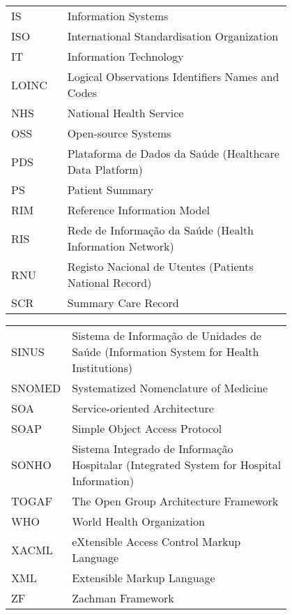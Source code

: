 \begin{flushleft}
\begin{tabular}{l p{0.8\linewidth}}
IS		& Information Systems \\
ISO		& International Standardisation Organization \\
IT		& Information Technology \\
LOINC   & Logical Observations Identifiers Names and Codes \\
NHS		& National Health Service \\
OSS		& Open-source Systems \\
PDS		& Plataforma de Dados da Saúde (Healthcare Data Platform) \\
PS		& Patient Summary \\
RIM		& Reference Information Model \\
RIS		& Rede de Informação da Saúde (Health Information Network) \\
RNU		& Registo Nacional de Utentes (Patients National Record) \\
SCR		& Summary Care Record
\end{tabular}
\end{flushleft}

\begin{flushleft}
\begin{tabular}{l p{0.8\linewidth}}
SINUS	& Sistema de Informação de Unidades de Saúde (Information System for Health Institutions)\\
SNOMED	& Systematized Nomenclature of Medicine \\
SOA		& Service-oriented Architecture \\
SOAP	& Simple Object Access Protocol \\
SONHO	& Sistema Integrado de Informação Hospitalar (Integrated System for Hospital Information) \\
TOGAF   & The Open Group Architecture Framework \\
WHO		& World Health Organization \\
XACML	& eXtensible Access Control Markup Language \\
XML	    & Extensible Markup Language \\
ZF		& Zachman Framework 
\end{tabular}
\end{flushleft}